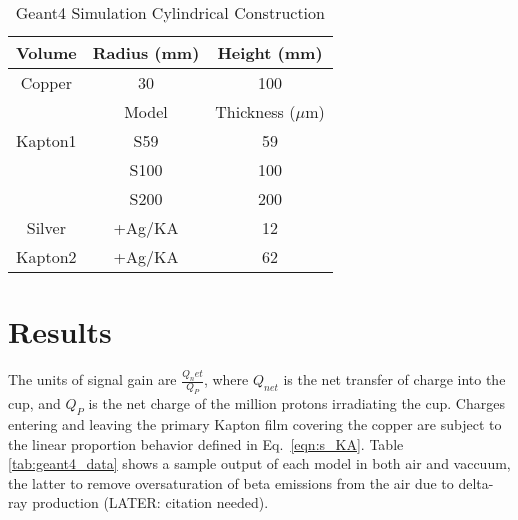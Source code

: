 \documentclass{mc2015}
\begin{document}
\begin{table}
  \centering
  \caption{Geant4 Simulation Cylindrical Construction}
  \begin{tabular}{ccc}
    \toprule
    Volume  & Radius (mm) & Height (mm) \\
    \midrule
    Copper  & \num{30} & \num{100} \\
    \toprule\toprule
            & Model    & Thickness ($\mu$m) \\
    \midrule
    Kapton1 & S59      & \num{59}  \\
            & S100     & \num{100} \\
            & S200     & \num{200} \\
    Silver  & +Ag/KA   & \num{12}  \\
    Kapton2 & +Ag/KA   & \num{62}  \\
    \bottomrule
  \end{tabular}
  \label{tab:geant4setup}
\end{table}


\section{Results}

The units of signal gain are $\frac{Q_net}{Q_P}$, where $Q_{net}$ is the net transfer of charge into the cup, and $Q_P$ is the net charge of the million protons irradiating the cup.  Charges entering and leaving the primary Kapton film covering the copper are subject to the linear proportion behavior defined in Eq.~\ref{eqn:s_KA}.  Table \ref{tab:geant4_data} shows a sample output of each model in both air and vaccuum, the latter to remove oversaturation of beta emissions from the air due to delta-ray production (LATER: citation needed).
\end{document}
